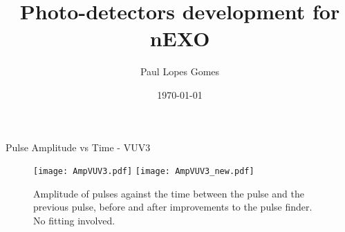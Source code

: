 \documentclass{beamer}
\title{Photo-detectors development for nEXO}
\author[]{Paul Lopes Gomes}%
\institute[]{\texttt{[image: ./TRIUMF.png]}}
\date{\today}
\begin{document}
\begin{frame}
\maketitle
\end{frame}


\begin{frame}{Pulse Amplitude vs Time - VUV3}
\begin{figure}
\centering
\texttt{[image: AmpVUV3.pdf]}%
\texttt{[image: AmpVUV3\_new.pdf]}
\caption{Amplitude of pulses against the time between the pulse and the previous pulse, before and after improvements to the pulse finder. No fitting involved.}
\end{figure}
\end{frame}
\end{document}
